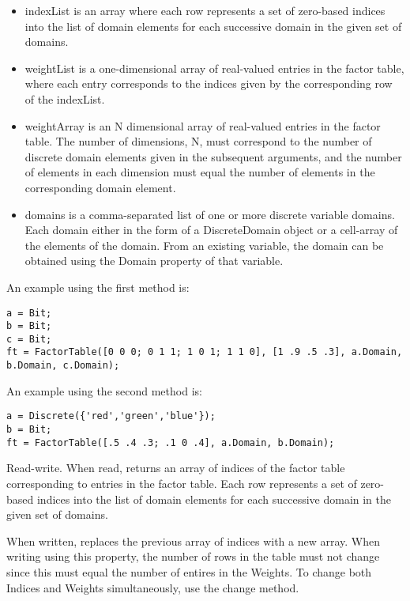 \begin{itemize}
\item indexList is an array where each row represents a set of zero-based indices into the list of domain elements for each successive domain in the given set of domains.
\item weightList is a one-dimensional array of real-valued entries in the factor table, where each entry corresponds to the indices given by the corresponding row of the indexList.
\item weightArray is an N dimensional array of real-valued entries in the factor table.  The number of dimensions, N, must correspond to the number of discrete domain elements given in the subsequent arguments, and the number of elements in each dimension must equal the number of elements in the corresponding domain element.
\item domains is a comma-separated list of one or more discrete variable domains.  Each domain either in the form of a DiscreteDomain object or a cell-array of the elements of the domain.  From an existing variable, the domain can be obtained using the Domain property of that variable.
\end{itemize}

An example using the first method is:
\begin{lstlisting}
a = Bit;
b = Bit;
c = Bit;
ft = FactorTable([0 0 0; 0 1 1; 1 0 1; 1 1 0], [1 .9 .5 .3], a.Domain, b.Domain, c.Domain);
\end{lstlisting}

An example using the second method is:
\begin{lstlisting}
a = Discrete({'red','green','blue'});
b = Bit;
ft = FactorTable([.5 .4 .3; .1 0 .4], a.Domain, b.Domain);
\end{lstlisting}




Read-write.  When read, returns an array of indices of the factor table corresponding to entries in the factor table.  Each row represents a set of zero-based indices into the list of domain elements for each successive domain in the given set of domains.

When written, replaces the previous array of indices with a new array.  When writing using this property, the number of rows in the table must not change since this must equal the number of entires in the Weights.  To change both Indices and Weights simultaneously, use the change method.

